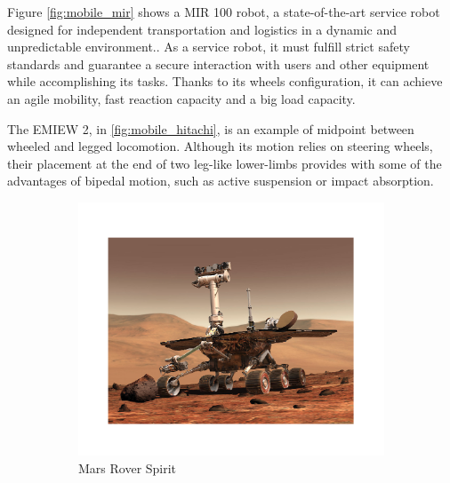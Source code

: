 Figure \ref{fig:mobile_mir} shows a MIR 100 robot, a state-of-the-art service robot designed for independent transportation and logistics in a dynamic and unpredictable environment..
As a service robot, it must fulfill strict safety standards and guarantee a secure interaction with users and other equipment while accomplishing its tasks.
Thanks to its wheels configuration, it can achieve an agile mobility, fast reaction capacity and a big load capacity.

The EMIEW 2, in \ref{fig:mobile_hitachi}, is an example of midpoint between wheeled and legged locomotion.
Although its motion relies on steering wheels, their placement at the end of two leg-like lower-limbs provides with some of the advantages of bipedal motion, such as active suspension or impact absorption.

\begin{figure}[h]
\label{fig:mobile_robots}
	\centering
    \begin{subfigure}[b]{0.32\textwidth}
        \includegraphics[width=\textwidth]{figures/mobile_rover.pdf}
        \caption{Mars Rover Spirit}
        \label{fig:mobile_rover}
    \end{subfigure}
    \centering
    \begin{subfigure}[b]{0.32\textwidth}

\end{subfigure}
\end{figure}
